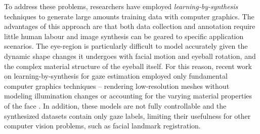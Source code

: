To address these problems, researchers have employed \emph{learning-by-synthesis} techniques to generate large amounts training data with computer graphics.
The advantages of this approach are that both data collection and annotation require little human labour and image synthesis can be geared to specific application scenarios.
The eye-region is particularly difficult to model accurately given the dynamic shape changes it undergoes with facial motion and eyeball rotation, and the complex material structure of the eyeball itself.
For this reason, recent work on learning-by-synthesis for gaze estimation employed only fundamental computer graphics techniques -- rendering low-resolution meshes without modeling illumination changes or accounting for the varying material properties of the face \cite{sugano2014learning}.
In addition, these models are not fully controllable and the synthesized datasets contain only gaze labels, limiting their usefulness for other computer vision problems, such as facial landmark registration.





